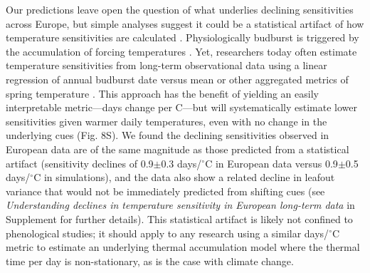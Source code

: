 \documentclass{article}
\begin{document}
\par Our predictions leave open the question of what underlies declining sensitivities across Europe, but simple analyses suggest it could be a statistical artifact of how temperature sensitivities are calculated \citep{vitasse2018,gusewell2017}. Physiologically budburst is triggered by the accumulation of forcing temperatures \citep{hanninen1995,chuine2016}. Yet, researchers today often estimate temperature sensitivities from long-term observational data using a linear regression of annual budburst date versus mean or other aggregated metrics of spring temperature \citep[e.g.,][]{Wolkovich:2012n}. This approach has the benefit of yielding an easily interpretable metric---days change per \degree C---but will systematically estimate lower sensitivities given warmer daily temperatures, even with no change in the underlying cues (Fig. 8S). We found the declining sensitivities observed in European data are of the same magnitude as those predicted from a statistical artifact (sensitivity declines of 0.9$\pm$0.3 days/$^{\circ}$C in European data versus 0.9$\pm$0.5 days/$^{\circ}$C in simulations), and the data also show a related decline in leafout variance that would not be immediately predicted from shifting cues (see \emph{Understanding declines in temperature sensitivity in European long-term data} in Supplement for further details). This statistical artifact is likely not confined to phenological studies; it should apply to any research using a similar days/$^{\circ}$C metric to estimate an underlying thermal accumulation model where the thermal time per day is non-stationary, as is the case with climate change. 
\end{document}
